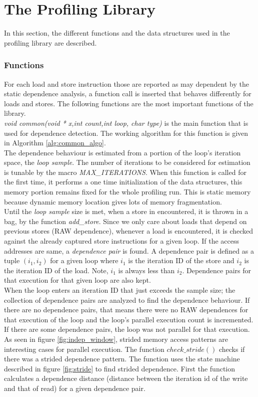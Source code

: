 \documentclass[10pt]{report}          %
\begin{document}
\section{The Profiling Library}
\label{library}

In this section, the different functions and the data structures used in the profiling library are described.  

\subsubsection{Functions}

For each load and store instruction those are reported as may dependent by the static dependence analysis, a function call is inserted that behaves differently for loads and stores.  The following functions are the most important functions of the library. \\ 
\textit{void common(void * x,int count,int loop, char type)} is the main function that is used for dependence detection.  The working algorithm for this function is given in Algorithm \ref{alg:common_algo}. \\
The dependence behaviour is estimated from a portion of the loop's iteration space, the \textit{loop sample}.  The number of iterations to be considered for estimation is tunable by the macro \textit{MAX\_ITERATIONS}.  When this function is called for the first time, it performs a one time initialization of the data structures, this memory portion remains fixed for the whole profiling run.  This is static memory because dynamic memory location gives lots of memory fragmentation. \\
Until the \textit{loop sample} size is met, when a store in encountered, it is thrown in a bag, by the function \textit{add\_store}.  Since we only care about loads that depend on previous stores (RAW dependence), whenever a load is encountered, it is checked against the already captured store instructions for a given loop.  If the access addresses are same, a \textit{dependence pair} is found.  A dependence pair is defined as a tuple $(i_1,i_2)$ for a given loop where $i_1$ is the iteration ID of the store and $i_2$ is the iteration ID of the load. Note, $i_1$ is always less than $i_2$. Dependence pairs for that execution for that given loop are also kept.\\
When the loop enters an iteration ID that just exceeds the sample size; the collection of dependence pairs are analyzed to find the dependence behaviour.  If there are no dependence pairs, that means there were no RAW dependences for that execution of the loop and the loop's parallel execution count is incremented.  If there are some dependence pairs, the loop was not parallel for that execution.  As seen in figure \ref{fig:indep_window}, strided memory access patterns are interesting cases for parallel execution. The function $check\_stride()$ checks if there was a strided dependence pattern. The function uses the state machine described in figure \ref{fig:stride} to find strided dependence.  First the function calculates a dependence distance (distance between the iteration id of the write and that of read) for a given dependence pair. \\
\end{document}
